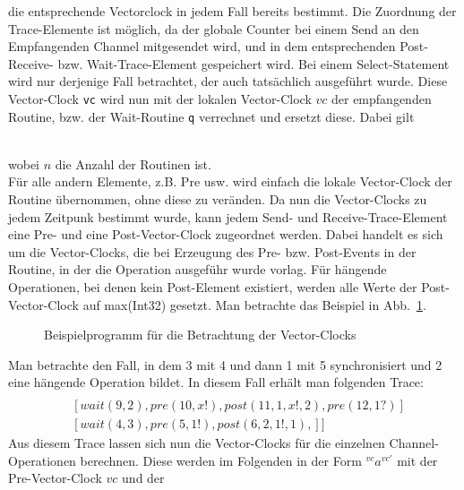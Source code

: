 die entsprechende Vectorclock in jedem Fall bereits bestimmt. Die Zuordnung der Trace-Elemente 
ist möglich, da der globale Counter bei einem Send an den Empfangenden Channel mitgesendet 
wird, und in dem entsprechenden Post-Receive- bzw. Wait-Trace-Element gespeichert wird.
Bei einem Select-Statement wird nur derjenige Fall betrachtet, der auch tatsächlich ausgeführt wurde.
Diese Vector-Clock \texttt{vc}
wird nun mit der lokalen Vector-Clock $vc$ der empfangenden Routine, bzw. der Wait-Routine 
\texttt{q} verrechnet und ersetzt diese. Dabei gilt\\
\begin{figure}[h]
  \centering
  
\end{figure}\\
wobei $n$ die Anzahl der Routinen ist.\\
Für alle andern Elemente, z.B. Pre usw. wird einfach die lokale Vector-Clock der Routine übernommen, 
ohne diese zu veränden. Da nun die Vector-Clocks zu jedem Zeitpunk bestimmt wurde, kann jedem 
Send- und Receive-Trace-Element eine Pre- und eine Post-Vector-Clock zugeordnet werden. 
Dabei handelt es sich um die Vector-Clocks, die bei Erzeugung des Pre- bzw. Post-Events in 
der Routine, in der die Operation ausgeführ wurde vorlag. Für hängende Operationen, 
bei denen kein Post-Element existiert, werden alle Werte der Post-Vector-Clock auf 
max(Int32) gesetzt.
Man betrachte das Beispiel in Abb.~\ref{Chap:Analyze-Sec:Channel-SubSec:Dangling-Fig:PorgVC}.
\begin{figure}[h!]
  \centering
  
  \caption{Beispielprogramm für die Betrachtung der Vector-Clocks}
  \label{Chap:Analyze-Sec:Channel-SubSec:Dangling-Fig:PorgVC}
\end{figure}
Man betrachte den Fall, in dem 3 mit 4 und dann 1 mit 5 synchronisiert und 2 eine hängende Operation bildet.
In diesem Fall erhält man folgenden Trace:
\begin{align*}
  [&[signal(1, 2), signale(2, 3), pre(1, x?), post(7, 1, x?, 6, 1), pre(8, x?), post(13, 1, x?, 11, 2)]\\
  &[wait(9, 2), pre(10, x!), post(11, 1, x!, 2), pre(12, 1?)]\\
  &[wait(4, 3), pre(5, 1!), post(6, 2, 1!, 1),]
  ]
\end{align*}
Aus diesem Trace lassen sich nun die Vector-Clocks für die einzelnen Channel-Operationen berechnen.
Diese werden im Folgenden in der Form $^{vc}a^{vc'}$ mit der Pre-Vector-Clock $vc$ und der 
